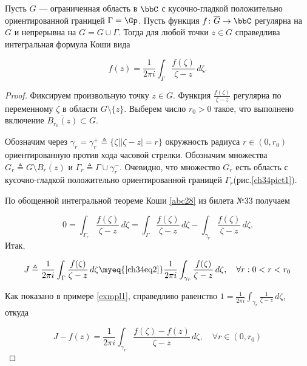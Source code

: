 \begin{thm} \label{ch34thm1}

Пусть $G$ --- ограниченная область в $\bbC$ с кусочно-гладкой положительно ориентированной границей $\Gamma= \Gp$. Пусть функция $f\colon \overline{G}\to \bbC$ регулярна на $G$ и непрерывна на $G=G\cup\Gamma$. Тогда для любой точки $z\in G$ справедлива интегральная формула Коши вида
 
 \begin{equation} \label{ch34eq1}
 f(z) = \frac{1}{2\pi i}\int_\Gamma \frac{f(\zeta)}{\zeta - z}\,d\zeta.
 \end{equation}
\end{thm}
\begin{proof}
Фиксируем произвольную точку $z \in G$. Функция $\frac{f(\zeta)}{\zeta - z}$ регулярна по переменному $\zeta$ в области $G \setminus \{z\}$. Выберем число $r_0 > 0$ такое, что выполнено включение $\overline{B_{r_0}(z)}\subset G$. 

\label{ch34pict1}
Обозначим через $\gamma_r=\gamma_r^{+} \triangleq \{ \zeta \bigl| |\zeta - z| = r \}$ окружность радиуса $r \in (0, r_0)$ ориентированную против хода часовой стрелки. Обозначим множества $G_r \triangleq G \setminus \overline{B_r(z)}$ и $\Gamma_r \triangleq \Gamma \cup \gamma_r^{-}$. Очевидно, что множество $G_r$ есть область с кусочно-гладкой положительно ориентированной границей $\Gamma_r$(рис.\ref{ch34pict1}). 

По обощенной интегральной теореме Коши \ref{abc28} из билета №33 получаем

 \begin{equation} \label{ch34eq2}
 0 = \int_{\Gamma_r} \frac{f(\zeta)}{\zeta - z}\,d\zeta = \int_\Gamma \frac{f(\zeta)}{\zeta - z}\,d\zeta - \int_{\gamma_r} \frac{f(\zeta)}{\zeta - z}\,d\zeta.
 \end{equation}
Итак,

\begin{equation} \label{ch34eq3}
J \triangleq \frac{1}{2\pi i} \int_\Gamma \frac{f(\zeta)}{\zeta - z}\,d\zeta \myeq{\eqref{ch34eq2}} \frac{1}{2\pi i} \int_{\gamma_r} \frac{f(\zeta)}{\zeta - z}\,d\zeta,  \quad  \forall r: 0 < r < r_0
\end{equation}

Как показано в примере \ref{exmpl1}, справедливо равенство $1 = \frac{1}{2\pi i} \int_{\gamma_r} \frac{1}{\zeta - z}\,d\zeta$, откуда 

$$J - f(z) = \frac{1}{2\pi i} \int_{\gamma_r} \frac{f(\zeta) - f(z)}{\zeta - z}\,d\zeta, \quad  \forall r \in (0,r_0)$$


\end{proof}
